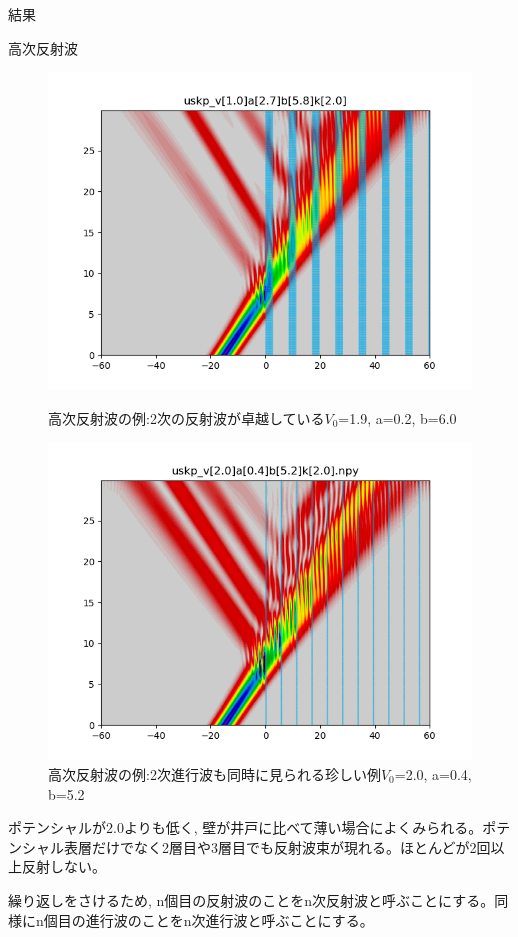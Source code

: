 \documentclass[a4paper, lualatex]{bxjsarticle}
\begin{document}
\begin{section}{結果}
\begin{subsection}{高次反射波}
\begin{figure}[h]
\begin{minipage}{0.5\hsize}
            \centering
            \includegraphics[width=0.9\hsize]{tajuhan3.png}
            \caption{高次反射波の例:2次の反射波が卓越している$V_0$=1.9, a=0.2, b=6.0}
        \end{minipage}
        \begin{minipage}{0.5\hsize}
            \centering
            \includegraphics[width=0.9\hsize]{tajuhan4.png}
            \caption{高次反射波の例:2次進行波も同時に見られる珍しい例$V_0$=2.0, a=0.4, b=5.2}
        \end{minipage}
    \end{figure}
    \par ポテンシャルが$2.0$よりも低く, 壁が井戸に比べて薄い場合によくみられる。ポテンシャル表層だけでなく2層目や3層目でも反射波束が現れる。ほとんどが2回以上反射しない。
    \par 繰り返しをさけるため, n個目の反射波のことをn次反射波と呼ぶことにする。同様にn個目の進行波のことをn次進行波と呼ぶことにする。

\end{subsection}
\end{section}
\end{document}

